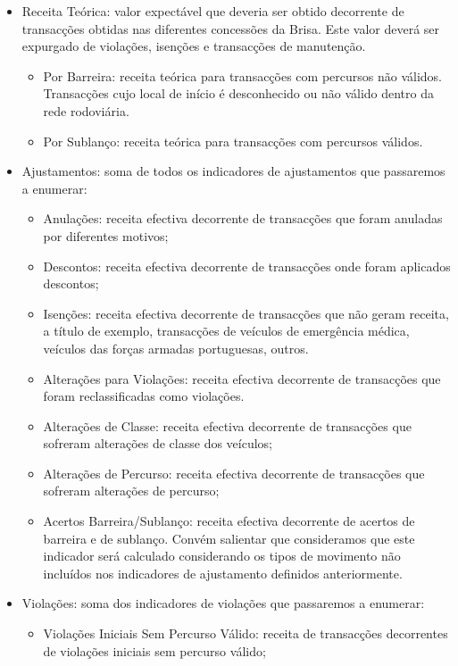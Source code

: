 \begin{itemize}  
	\item Receita Teórica: valor expectável que deveria ser obtido decorrente de transacções obtidas nas diferentes concessões da Brisa. Este valor deverá ser expurgado de violações, isenções e transacções de manutenção.
	\begin{itemize}
	\item Por Barreira: receita teórica para transacções com percursos não válidos. Transacções cujo local de início é desconhecido ou não válido dentro da rede rodoviária.
	\item Por Sublanço: receita teórica para transacções com percursos válidos.  
	\end{itemize}
	\item Ajustamentos: soma de todos os indicadores de ajustamentos que passaremos a enumerar:
	\begin{itemize}
	\item Anulações: receita efectiva decorrente de transacções que foram anuladas por diferentes motivos;
	\item Descontos: receita efectiva decorrente de transacções onde foram aplicados descontos;
	\item Isenções: receita efectiva decorrente de transacções que não geram receita, a título de exemplo, transacções de veículos de emergência médica, veículos das forças armadas portuguesas, outros. 
	\item Alterações para Violações: receita efectiva decorrente de transacções que foram reclassificadas como violações.
	\item	Alterações de Classe: receita efectiva decorrente de transacções que sofreram alterações de classe dos veículos;
	\item Alterações de Percurso: receita efectiva decorrente de transacções que sofreram alterações de percurso;
	\item Acertos Barreira/Sublanço: receita efectiva decorrente de acertos de barreira e de sublanço. Convém salientar que consideramos que este indicador será calculado considerando os tipos de movimento não incluídos nos indicadores de ajustamento definidos anteriormente.
	\end{itemize}
	\item Violações: soma dos indicadores de violações que passaremos a enumerar:
	\begin{itemize}
	\item Violações Iniciais Sem Percurso Válido: receita de transacções decorrentes de violações iniciais sem percurso válido;

\end{itemize}
\end{itemize}
